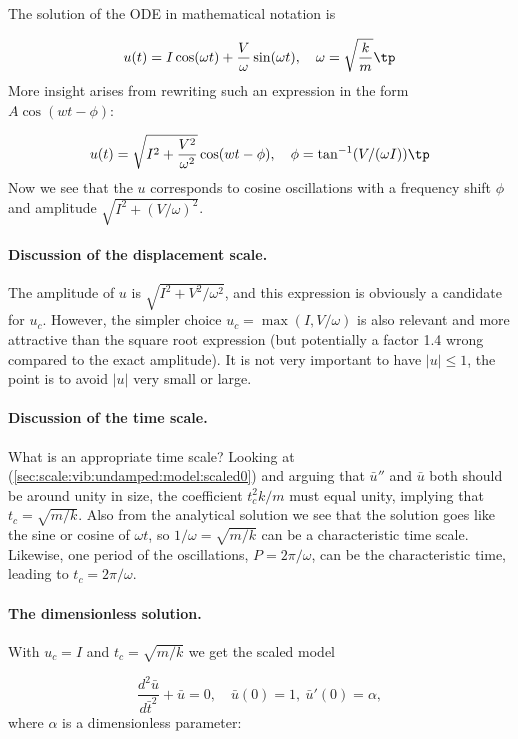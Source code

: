 \documentclass[graybox,envcountchap,sectrefs,final]{svmonodo}
\begin{document}
The solution of the ODE in mathematical notation is

\[ u(t) = I\cos(\omega t) + \frac{V}{\omega}\sin(\omega t),\quad \omega = \sqrt{\frac{k}{m}}\tp\]
More insight arises from rewriting such an expression in the form
$A\cos(wt - \phi)$:

\[ u(t) = \sqrt{I^2 + \frac{V^2}{\omega^2}}\cos(wt - \phi),\quad
\phi = \tan^{-1}(V/(\omega I))\tp
\]
Now we see that the $u$ corresponds to cosine oscillations with a
frequency shift $\phi$ and amplitude $\sqrt{I^2 + (V/\omega)^2}$.


\paragraph{Discussion of the displacement scale.}
The amplitude of $u$ is $\sqrt{I^2 + V^2/\omega^2}$, and this
expression is obviously a candidate for $u_c$.  However, the simpler
choice $u_c=\max (I, V/\omega)$ is also relevant and more attractive
than the square root expression (but potentially a factor 1.4 wrong
compared to the exact amplitude).  It is not very important to have
$|u|\leq 1$, the point is to avoid $|u|$ very small or large.

\paragraph{Discussion of the time scale.}
What is an appropriate time scale? Looking at
(\ref{sec:scale:vib:undamped:model:scaled0}) and arguing that
$\bar u''$ and $\bar u$ both should be around unity in size, the
coefficient $t_c^2k/m$ must equal unity, implying that $t_c=\sqrt{m/k}$.
Also from the analytical solution we see that the solution goes like the
sine or cosine of $\omega t$, so $1/\omega = \sqrt{m/k}$ can be a characteristic
time scale. Likewise, one period of the oscillations, $P=2\pi/\omega$, can
be the characteristic time, leading to $t_c=2\pi/\omega$.

\paragraph{The dimensionless solution.}
With $u_c=I$ and $t_c=\sqrt{m/k}$ we get the scaled model

\begin{equation}
\frac{d^2\bar u}{d\bar t^2} + \bar u = 0,
\quad \bar u(0)=1,\ \bar u'(0)=\alpha,
\label{sec:scale:vib:undamped:model:scaled1}
\end{equation}
where $\alpha$ is a dimensionless parameter:
\end{document}
